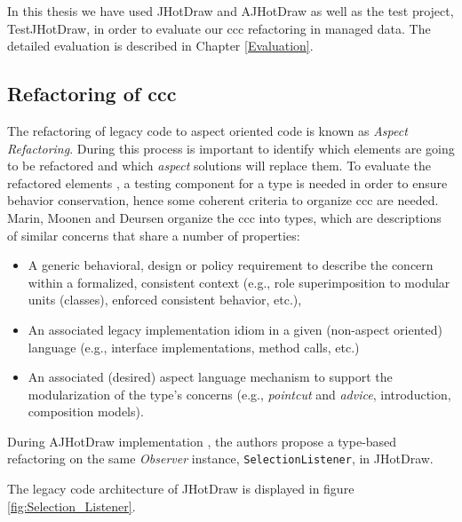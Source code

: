 In this thesis we have used JHotDraw and AJHotDraw as well as the test project, TestJHotDraw, in order to evaluate our \ac{ccc} refactoring in managed data. 
The detailed evaluation is described in Chapter \ref{Evaluation}.

\subsection{Refactoring of \acrlong{ccc}}\label{Refactoring of ccc}
The refactoring of legacy code to aspect oriented code is known as \textit{Aspect Refactoring}. 
During this process is important to identify which elements are going to be refactored and which \textit{aspect} solutions will replace them. 
To evaluate the refactored elements \cite{fowler2009refactoring}, a testing component for a type is needed in order to ensure behavior conservation, hence some coherent criteria to organize \ac{ccc} are needed. 
Marin, Moonen and Deursen \cite{marin2005approach} organize the \ac{ccc} into types, which are descriptions of similar concerns that share a number of properties: 

\begin{itemize}
	\item A generic behavioral, design or policy requirement to describe the concern within a formalized, consistent context (e.g., role superimposition to modular units (classes), enforced consistent behavior, etc.),

	\item An associated legacy implementation idiom in a given (non-aspect oriented) language (e.g., interface implementations, method calls, etc.)

	\item An associated (desired) aspect language mechanism to support the modularization of the type's concerns (e.g., \textit{pointcut} and \textit{advice}, introduction, composition models).
\end{itemize}

During AJHotDraw implementation\cite{marin2005approach} \cite{hannemann2005role}, the authors propose a type-based refactoring on the same \textit{Observer} instance, \texttt{SelectionListener}, in JHotDraw. 

The legacy code architecture of JHotDraw is displayed in figure \ref{fig:Selection_Listener}.

